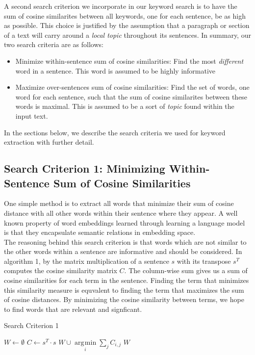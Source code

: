 \documentclass[12pt]{article}
\DeclareMathOperator*{\argmin}{\arg\!\min}
\begin{document}
A second search criterion we incorporate in our keyword search is to have the sum of cosine similarites between all keywords, one for each sentence,
be as high as possible. This choice is justified by the assumption that a paragraph or section of a text will carry around a \textit{local topic}
throughout its sentences. In summary, our two search criteria are as follows:

\begin{itemize}
  \item Minimize within-sentence sum of cosine similarities: Find the most \textit{different} word in a sentence. This word is assumed to be highly informative
  \item Maximize over-sentences sum of cosine similarities: Find the set of words, one word for each sentence, such that the sum of cosine similarites between these words is maximal. This is assumed to be a sort of \textit{topic} found within the input text.
\end{itemize}
In the sections below, we describe the search criteria we used for keyword extraction with further detail.

\subsection{Search Criterion 1: Minimizing Within-Sentence Sum of Cosine Similarities}
One simple method is to extract all words that minimize their sum of cosine distance with all other words within their sentence where they appear. A well known property of word embeddings learned through learning a language model is that they encapsulate semantic relations in embedding space. \\

The reasoning behind this search criterion is that words which are not similar to the other words within a sentence are informative and should be considered. In algorithm 1, by the matrix multiplication of a sentence $s$ with its transpose $s^T$ computes the cosine similarity matrix $C$. The column-wise sum gives us a sum of cosine similarities for each term in the sentence. Finding the term that minimizes this similarity measure is equvalent to finding the term that maximizes the sum of cosine distances. By minimizing the cosine similarity between terms, we hope to find words that are relevant and signficant.

\begin{algorithm}[H]
\caption{Search Criterion 1}\label{euclid}
\begin{algorithmic}[1]
\State $W \gets \emptyset $
\State $ C \gets s^ T \cdot s$
\State $ W \cup \argmin\limits_{i} \sum\limits_{j} C_{i,j}$
\State
\EndFor
\State \Return $W$
\EndProcedure
\end{algorithmic}
\end{algorithm}
\end{document}
